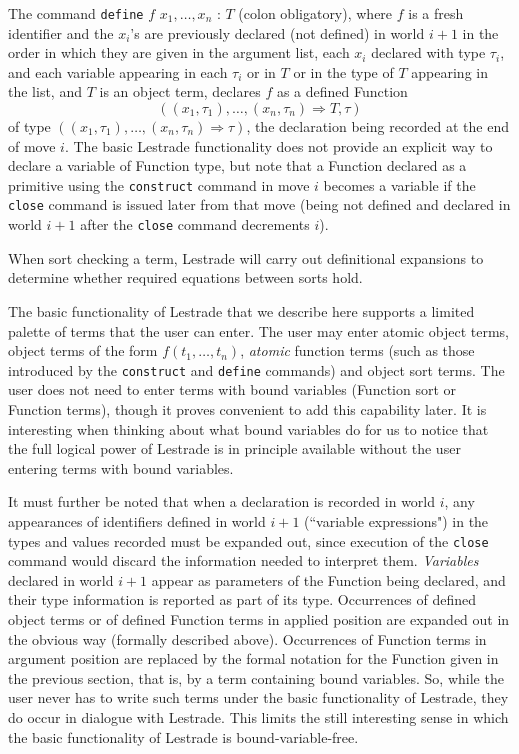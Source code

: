 \documentclass{article}
\begin{document}
The command {\tt define} $f$ $x_1, \ldots,x_n$ : $T$ (colon obligatory), where $f$ is a fresh identifier and the $x_i$'s are previously declared (not defined) in world $i+1$ in the order in which they are given in the argument list, each $x_i$ declared with type $\tau_i$, and each variable appearing in each $\tau_i$ or in $T$ or in the type of $T$ appearing in the list, and $T$ is an object term, declares $f$ as a defined Function $$((x_1,\tau_1),\ldots,(x_n,\tau_n) \Rightarrow T,\tau)$$ of type
$((x_1,\tau_1),\ldots,(x_n,\tau_n) \Rightarrow \tau)$, the declaration being recorded at the end of move $i$.  The basic Lestrade functionality does not provide an explicit way to declare a variable of Function type, but note that a Function declared as a primitive using the {\tt construct} command in move $i$ becomes a variable if the {\tt close} command is issued later from that move (being not defined and declared in world $i+1$ after the {\tt close} command decrements $i$).

When sort checking a term, Lestrade will carry out definitional expansions to determine whether required equations between sorts hold.

The basic functionality of Lestrade that we describe here supports a limited palette of terms that the user can enter.  The user may enter atomic object terms,
object terms of the form $f(t_1,\ldots,t_n)$, {\em atomic\/} function terms (such as those introduced by the {\tt construct} and {\tt define} commands) and object sort terms.  The user does not need to enter terms with bound variables (Function sort or Function terms), though it proves convenient to add this capability later.  It is interesting when thinking about what bound variables do for us to notice that the full logical power of Lestrade is in principle available without the user entering terms with bound variables.  

It must further be noted that when a declaration is recorded in world $i$, any appearances of identifiers defined in world $i+1$ (``variable expressions") in the types and values recorded must be expanded out, since
execution of the {\tt close} command would discard the information needed to interpret them.  {\em Variables\/} declared in world $i+1$ appear as parameters of the Function being declared, and their type information is reported as part of its type.   Occurrences of defined object terms or of defined Function terms in applied position are expanded out in the obvious way (formally described above).   Occurrences of Function terms in argument position are replaced by the formal notation for the Function given in the previous section, that is, by a term containing bound variables.  So, while the user never has to write such terms under the basic functionality of Lestrade, they do occur in dialogue with Lestrade.  This limits the still interesting sense in which the basic functionality of Lestrade is bound-variable-free.
\end{document}
